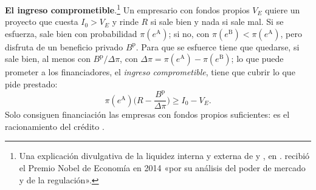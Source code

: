 \documentclass[11pt]{article}
\begin{document}
\begin{anotaciones}
\textbf{El ingreso comprometible}\nocite{HolmstromTirole1997Financial,Tirole2006Theory}.\footnote{Una explicación divulgativa de la liquidez interna y externa de  y , en \textcite{FernandezVillaverde2016Liquidez}.  recibió el Premio Nobel de Economía en 2014 «por su análisis del poder de mercado y de la regulación»\nocite{Nobel2014Tirole}.} Un empresario con fondos propios $V_E$ quiere un proyecto que cuesta $I_0>V_E$ y rinde $R$ si sale bien y nada si sale mal. Si se esfuerza, sale bien con probabilidad $\pi(e^{\mathrm A})$; si no, con $\pi(e^{\mathrm B})<\pi(e^{\mathrm A})$, pero disfruta de un beneficio privado $B^{\mathrm p}$. Para que se esfuerce tiene que quedarse, si sale bien, al menos con $B^{\mathrm p}/\Delta\pi$, con $\Delta\pi=\pi(e^{\mathrm A})-\pi(e^{\mathrm B})$; lo que puede prometer a los financiadores, el \emph{ingreso comprometible}, tiene que cubrir lo que pide prestado:
\[
\pi(e^{\mathrm A})\Big(R-\frac{B^{\mathrm p}}{\Delta\pi}\Big)\geq I_0-V_E.
\]
Solo consiguen financiación las empresas con fondos propios suficientes: es el racionamiento del crédito .
\end{anotaciones}
\end{document}
